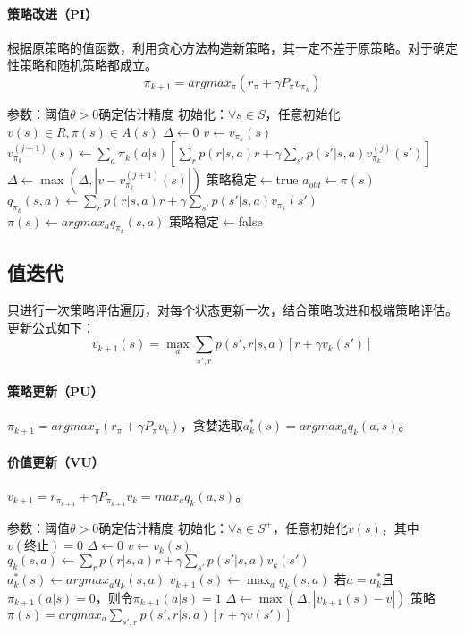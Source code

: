 \documentclass[
12pt, %
a4paper, 
oneside, %
headinclude,footinclude, %
]{scrartcl}
\begin{document}
\paragraph{策略改进（PI）}
根据原策略的值函数，利用贪心方法构造新策略，其一定不差于原策略。对于确定性策略和随机策略都成立。
$$ \pi_{k + 1} = argmax_{\pi}(r_{\pi} + \gamma P_{\pi}v_{\pi_k}) $$
\begin{myalgorithm}[策略迭代]
\State 参数：阈值$ \theta > 0 $确定估计精度
\State 初始化：$ \forall s \in S $，任意初始化$ v(s) \in R, \pi(s) \in A(s) $
\Repeat
\Repeat {}
\State $ \Delta \gets 0 $
\State $ v \gets v_{\pi_k}(s) $
\State $ v_{\pi_k}^{(j + 1)}(s) \gets \sum_a \pi_k(a|s)[\sum_r p(r|s,a)r + \gamma \sum_{s'}p(s'|s,a)v_{\pi_k}^{(j)}(s')] $
\State $ \Delta \gets \max(\Delta, |v - v_{\pi_k}^{(j+1)}(s)|) $
\EndFor
\Until{$ \Delta < \theta $}
\State 策略稳定$ \gets $true 
\State $ a_{old} \gets \pi(s) $
\State $ q_{\pi_k}(s,a) \gets \sum_r p(r|s,a)r + \gamma \sum_{s'} p(s'|s,a)v_{\pi_k}(s') $
\EndFor
\State $ \pi(s) \gets argmax_a q_{\pi_k}(s,a) $
\State 策略稳定$ \gets $false
\EndIf
\EndFor
{}
\end{myalgorithm}
\subsection{值迭代}
只进行一次策略评估遍历，对每个状态更新一次，结合策略改进和极端策略评估。
更新公式如下：
$$ v_{k + 1}(s) = \max_a \sum_{s', r} p(s', r|s, a)[r + \gamma v_k(s')] $$
\paragraph{策略更新（PU）}
$ \pi_{k + 1} = argmax_{\pi}(r_{\pi} + \gamma P_{\pi}v_k) $，贪婪选取$ a^*_k(s) = argmax_a q_k(a, s) $。
\paragraph{价值更新（VU）}
$ v_{k + 1} = r_{\pi_{k + 1}} + \gamma P_{\pi_{k + 1}}v_k = max_a q_k(a, s) $。
\begin{myalgorithm}[值迭代]
\State 参数：阈值$ \theta > 0 $确定估计精度
\State 初始化：$ \forall s \in S^+ $，任意初始化$ v(s) $，其中$ v(\text{终止}) = 0 $
\Repeat
\State $ \Delta \gets 0 $
\State $ v \gets v_k(s) $
\State $ q_k(s, a) \gets \sum_r p(r|s, a)r + \gamma \sum_{s'} p(s'|s, a)v_k(s') $
\EndFor
\State $ a^*_k(s) \gets argmax_a q_k(s, a) $
\State $ v_{k + 1}(s) \gets \max_a q_k(s, a) $
\State 若$ a = a^*_k $且$ \pi_{k + 1}(a|s) = 0 $，则令$ \pi_{k + 1}(a|s) = 1 $
\State $ \Delta \gets \max(\Delta, |v_{k+1}(s) - v|) $
\EndFor
\Until{$ \Delta < \theta $}
\State \Return 策略 $ \pi(s) = argmax_a \sum_{s',r}p(s',r|s,a)[r + \gamma v(s')] $
\end{myalgorithm}
\end{document}
